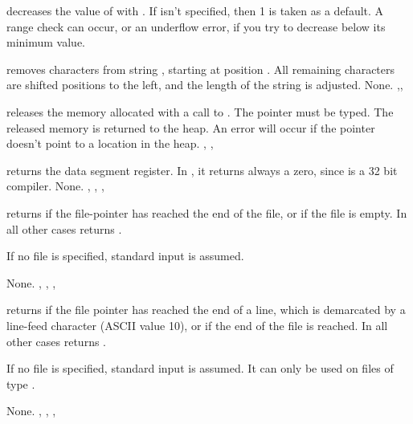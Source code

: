 \documentclass{report}
\begin{document}


{ decreases the value of  with .
If  isn't specified, then 1 is taken as a default.}
{A range check can occur, or an underflow error, if you try to decrease 
below its minimum value.}
{}



{ removes  characters from string , starting
at position . All remaining characters are shifted  
positions to the left, and the length of the string is adjusted.
}
{None.}
{,,}



{ releases the memory allocated with a call to .
The pointer  must be typed. The released memory is returned to the
heap.}
{An error will occur if the pointer doesn't point to a location in the
heap.}
{, , }



{ returns the data segment register. In \fpc, it returns always a
zero, since \fpc is a 32 bit compiler.}
{None.}
{, , , }



{ returns  if the file-pointer has reached the end of the
file, or if the file is empty. In all other cases  returns
.

If no file  is specified, standard input is assumed.}
{None.}
{, , , }



{ returns  if the file pointer has reached the end of a
line, which is demarcated by a line-feed character (ASCII value 10), or if
the end of the file is reached.
In all other cases  returns .

If no file  is specified, standard input is assumed.
It can only be used on files of type .}
{None.}
{, , , }
\end{document}
